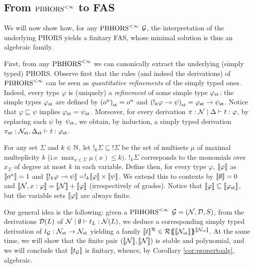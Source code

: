 \subsection{From $\text{PBHORS}^{<\infty}$ to FAS}

We will now show how, for any $\text{PBHORS}^{<\infty}$ $\mathcal{G}$, the interpretation of the underlying PHORS yields a finitary FAS, whose minimal solution is thus an algebraic family.


First, from any $\text{PBHORS}^{<\infty}$ we can canonically extract the underlying (simply typed) PHORS.
Observe first that the rules (and indeed the derivations) of $\text{PBHORS}^{<\infty}$ can be seen as \emph{quantitative refinements} of the simply typed ones. Indeed, every type $\varphi$ is (uniquely) a \emph{refinement} of some simple type ${\varphi}_{\mathrm{st}}$: the simple types ${\varphi}_{\mathrm{st}}$ are defined by ${(o^n)}_{\mathrm{st}}=o^n$ and ${(!_k\varphi\multimap\psi)}_{\mathrm{st}}={\varphi}_{\mathrm{st}}\to{\psi}_{\mathrm{st}}$.
Notice that $\varphi\sqsubseteq \psi$ implies ${\varphi}_{\mathrm{st}}={\psi}_{\mathrm{st}}$. 
Moreover, for every derivation $\pi:\mathcal{N}\mid\Delta \vdash t:\varphi$, 
by replacing each $\psi$ by ${\psi}_{\mathrm{st}}$, we obtain, by induction, a simply typed derivation ${\pi}_{\mathrm{st}}:{\mathcal{N}}_{\mathrm{st}},{\Delta}_{\mathrm{st}}\vdash t:{\varphi}_{\mathrm{st}}$.


 For any set $\Sigma$  and $k\in \mathbb{N}$, let $!_k\Sigma\subseteq !\Sigma$ be the set of multisets $\mu$ of maximal multeplicity $k$ (i.e $\max_{x \in \Sigma} \mu(x)\leq k)$. $!_k\Sigma$ corresponds to the monomials over $x_\Sigma$ of degree at most $k$ in each variable. 
  Define then, for every type $\varphi$, $\llbracket\varphi\rrbracket$ as $\llbracket o^n\rrbracket=1$ and $\llbracket!_k\varphi\multimap \psi\rrbracket=!_k\llbracket\varphi\rrbracket\times\llbracket\psi\rrbracket$. We extend this to contexts by $\llbracket\emptyset\rrbracket=0$ and $\llbracket\mathcal{N},x:\varphi\rrbracket=\llbracket\mathcal{N}\rrbracket+\llbracket\varphi\rrbracket$ (irrespectively of grades). Notice that $\llbracket\varphi\rrbracket\subseteq\llbracket{\varphi}_{\mathrm{st}}\rrbracket$, but the variable sets $\llbracket\varphi\rrbracket$ are always finite. 
   
   

      
   Our general idea is the following: given a $\text{PBHORS}^{<\infty}$ $\mathcal{G}=(\mathcal{N}, \mathcal{D}, S)$, from the derivations $\mathcal{D}(L)$ of $\mathcal{N}\mid\emptyset \vdash t_L:\mathcal{N}(L)$, we deduce a corresponding simply typed derivation of $ t_{\mathcal{G}}:{\mathcal{N}}_{\mathrm{st}}\to {\mathcal{N}}_{\mathrm{st}}$ yielding a family
   $\llbracket t\rrbracket^{\mathcal{R}}\in {\mathcal{R}}\{\!\!\{\llbracket{\mathcal{N}}_{\mathrm{st}}\rrbracket\}\!\!\}^{\llbracket{\mathcal{N}}_{\mathrm{st}}\rrbracket}$.  
  At the same time, we will show that the finite pair $(\llbracket\mathcal{N}\rrbracket,\llbracket\mathcal{N}\rrbracket)$ is stable and polynomial, and we will conclude that $\llbracket t_{\mathcal{G}}\rrbracket$ is finitary, whence, by Corollary \ref{cor:propertoalg}, algebraic.    
   
